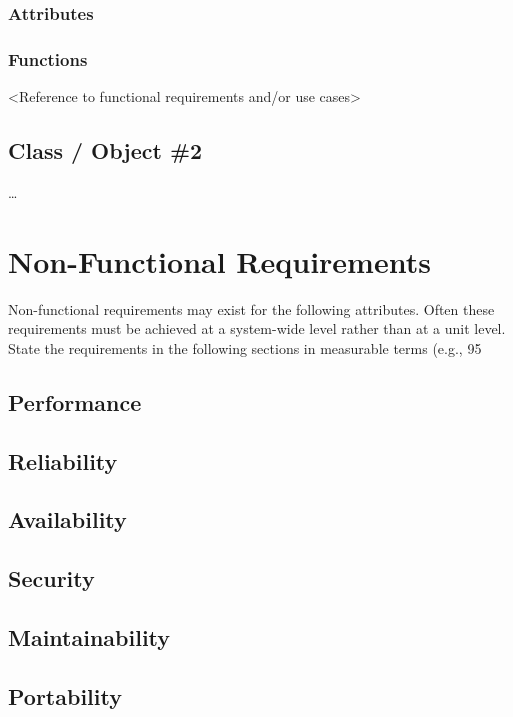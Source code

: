 \documentclass{scrreprt}
\begin{document}
      \subsubsection{Attributes}

      \subsubsection{Functions}

<Reference to functional requirements and/or use cases>

    \subsection{Class / Object \#2}
…
  \section{ Non-Functional Requirements}
Non-functional requirements may exist for the following attributes.  Often these requirements must be achieved at a system-wide level rather than at a unit level.  State the requirements in the following sections in measurable terms (e.g., 95%
    \subsection{Performance}

    \subsection{Reliability}

    \subsection{Availability}

    \subsection{Security}

    \subsection{Maintainability}

    \subsection{Portability}
\end{document}
